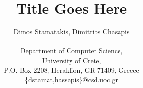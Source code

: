 \documentclass[11pt,twocolumn]{article}
\title{Title Goes Here}
\author{
Dimos Stamatakis, Dimitrios Chasapis \\ \\
Department of Computer Science, \\
University of Crete, \\
P.O. Box 2208, Heraklion, GR 71409, Greece \\
\{dstamat,hassapis\}@csd.uoc.gr
}
\begin{document}
\maketitle


%
%
%

{


}
\end{document}
